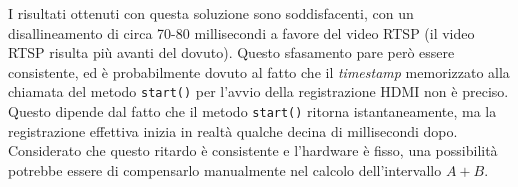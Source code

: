 I risultati ottenuti con questa soluzione sono soddisfacenti, con un disallineamento di circa 70-80 millisecondi a favore del video RTSP (il video RTSP risulta più avanti del dovuto). Questo sfasamento pare però essere consistente, ed è probabilmente dovuto al fatto che il \emph{timestamp} memorizzato alla chiamata del metodo \texttt{start()} per l'avvio della registrazione HDMI non è preciso. Questo dipende dal fatto che il metodo \texttt{start()} ritorna istantaneamente, ma la registrazione effettiva inizia in realtà qualche decina di millisecondi dopo. Considerato che questo ritardo è consistente e l'hardware è fisso, una possibilità potrebbe essere di compensarlo manualmente nel calcolo dell'intervallo $A+B$.

